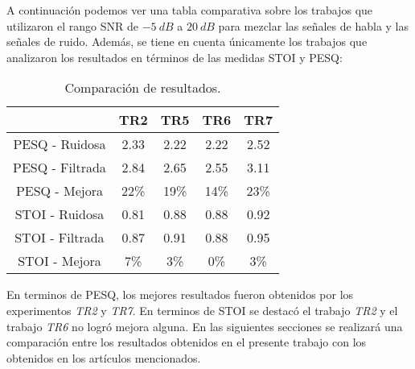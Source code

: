 A continuación podemos ver una tabla comparativa sobre los trabajos que utilizaron el rango SNR de $\SI{-5}{dB}$ a $\SI{20}{dB}$ para mezclar las señales de habla y las señales de ruido. Además, se tiene en cuenta únicamente los trabajos que analizaron los resultados en términos de las medidas STOI y PESQ:

\begin{table}[H]
	\centering
	\begin{tabular}{ |c|c|c|c|c| } 
		\hline
		& TR2 & TR5 & TR6 & TR7 \\ 
		\hline
		PESQ - Ruidosa & 2.33 & 2.22 & 2.22 & 2.52 \\
		PESQ - Filtrada & 2.84 & 2.65 & 2.55 & 3.11 \\
		PESQ - Mejora & 22\%  & 19\% & 14\% & 23\% \\
		\hline
		STOI - Ruidosa & 0.81 & 0.88 & 0.88 & 0.92 \\
		STOI - Filtrada & 0.87 & 0.91 & 0.88 & 0.95 \\
		STOI - Mejora & 7\% & 3\% & 0\% & 3\% \\
		\hline
	\end{tabular}
	\caption{Comparación de resultados.}
\end{table}

En terminos de PESQ, los mejores resultados fueron obtenidos por los experimentos \emph{TR2} y \emph{TR7}. En terminos de STOI se destacó el trabajo \emph{TR2} y el trabajo \emph{TR6} no logró mejora alguna. En las siguientes secciones se realizará una comparación entre los resultados obtenidos en el presente trabajo con los obtenidos en los artículos mencionados.
